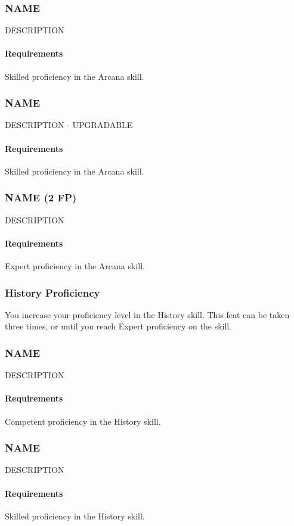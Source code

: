 \subsubsection{NAME} \label{feat::name}
    DESCRIPTION
    \paragraph{Requirements} Skilled proficiency in the Arcana skill.
\subsubsection{NAME} \label{feat::name}
    DESCRIPTION - UPGRADABLE
    \paragraph{Requirements} Skilled proficiency in the Arcana skill.
\subsubsection{NAME (2 FP)} \label{feat::name}
    DESCRIPTION
    \paragraph{Requirements} Expert proficiency in the Arcana skill.
\subsubsection{History Proficiency} \label{feat::historyprof}
    You increase your proficiency level in the History skill.
    This feat can be taken three times, or until you reach Expert proficiency on the skill.
\subsubsection{NAME} \label{feat::name}
    DESCRIPTION
    \paragraph{Requirements} Competent proficiency in the History skill.
\subsubsection{NAME} \label{feat::name}
    DESCRIPTION
    \paragraph{Requirements} Skilled proficiency in the History skill.
